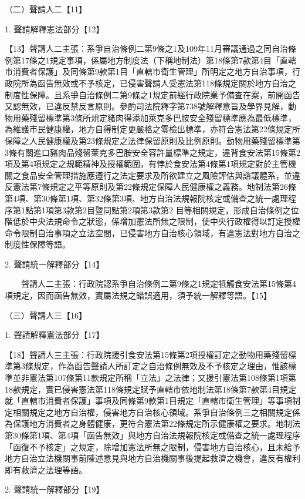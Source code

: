 \documentclass{ctexart} %
\begin{document}
{（二）聲請人二【11】

1. 聲請解釋憲法部分【12】

【13】聲請人二主張：系爭自治條例二第9條之1及109年11月審議通過之同自治條例第17條之1規定事項，係屬地方制度法（下稱地制法）第18條第7款第4目「直轄市消費者保護」及同條第9款第1目「直轄市衛生管理」所明定之地方自治事項，行政院所為函告無效或不予核定，已侵害聲請人受憲法第118條規定關於地方自治之制度性保障。且系爭自治條例二第9條之1規定前經行政院業予備查在案，前開函告又認無效，已違反禁反言原則。參酌司法院釋字第738號解釋意旨及學界見解，動物用藥殘留標準第3條所規定豬肉得添加萊克多巴胺安全殘留標準應為最低標準，為維護市民健康權，地方自得制定更嚴格之零檢出標準，亦符合憲法第22條規定所保障之人民健康權及第23條規定之法律保留原則及比例原則。動物用藥殘留標準第3條有關進口豬肉品殘留萊克多巴胺安全容許量標準之規定，違背食安法第15條第2項及第4項規定之規範精神及授權範圍，有悖於食安法第4條第1項規定對於主管機關之食品安全管理措施應遵行之法定要求及所欲建立之風險評估與諮議體系，並違反憲法第7條規定之平等原則及第22條規定保障人民健康權之義務。地制法第26條第4項、第30條第1項、第32條第3項、地方自治法規報院核定或備查之統一處理程序第1點第1項第3款第2目暨同點第2項第3款第2 目等相關規定，形成自治條例之位階低於中央法規命令之狀態，係增加憲法所無之限制，使中央行政權得以訂定授權命令限制自治事項之立法空間，已侵害地方自治核心領域，有違憲法對地方自治之制度性保障等語。

2. 聲請統一解釋部分【14】

　　聲請人二主張：行政院認系爭自治條例二第9條之1規定牴觸食安法第15條第4項規定，因而函告無效，實屬法規之錯誤適用，須予統一解釋等語。【15】

（三）聲請人三【16】

1. 聲請解釋憲法部分【17】

【18】聲請人三主張：行政院援引食安法第15條第2項授權訂定之動物用藥殘留標準第3條規定，作為函告聲請人所訂定之自治條例無效及不予核定之理由，惟該標準並非憲法第107條第11款規定所稱「立法」之法律；又援引憲法第108條第1項第18款規定，實已侵害憲法第118條規定賦予直轄市依地制法第18條第7款第4目規定就「直轄市消費者保護」事項及同條第9款第1目規定「直轄市衛生管理」等事項制定相關規定之地方自治權，侵害地方自治核心領域。系爭自治條例三之相關規定係為保護地方消費者之身體健康，更符合憲法第22條規定所示健康權之要求。地制法第30條第1項、第4項「函告無效」與地方自治法規報院核定或備查之統一處理程序「函復不予核定」之規定，除增加憲法所無之限制，侵害地方自治核心，且未給予地方自治立法機關事前陳述意見與地方自治機關事後提起救濟之機會，違反有權利即有救濟之法理等語。

2. 聲請統一解釋部分【19】

}
\end{document}
